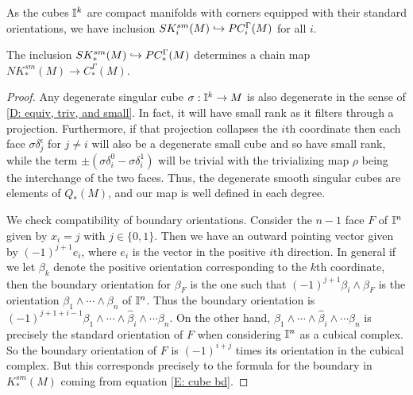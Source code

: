 As the cubes $\mathbb{I}^k$ are compact manifolds with corners equipped with their standard orientations,
 we have inclusion $SK^{sm}_i(M)\hookrightarrow PC_i^\Gamma(M)$ for all $i$.


\begin{lemma}
The inclusion $SK^{sm}_*(M)\hookrightarrow PC_*^\Gamma(M)$ determines a chain map $NK^{sm}_*(M) \to C_*^\Gamma(M)$.
\end{lemma}
\begin{proof}
Any degenerate singular cube $\sigma:\mathbb{I}^k \to M$ is also degenerate in the sense of \cref{D: equiv, triv, and small}. In fact, it will have small rank as it filters through a projection. Furthermore, if that projection collapses the $i$th coordinate then each face $\sigma \delta_j^\epsilon$ for $j\neq i$ will also be a degenerate small cube and so have small rank, while the term $\pm (\sigma \delta_i^0-\sigma \delta_i^1)$ will be trivial with the trivializing map $\rho$ being the interchange of the two faces. Thus, the degenerate smooth singular cubes are elements of $Q_*(M)$, and our map is well defined in each degree.

We check compatibility of boundary orientations. Consider the $n-1$ face $F$ of $\mathbb{I}^n$ given by $x_i = j$ with $j\in\{0,1\}$. Then we have an outward pointing vector given by $(-1)^{j+1}e_i$, where $e_i$ is the vector in the positive $i$th direction. In general if we let $\beta_k$ denote the positive orientation corresponding to the $k$th coordinate, then the boundary orientation for $\beta_F$ is the one such that
$(-1)^{j+1}\beta_i\wedge\beta_F$ is the orientation $\beta_1 \wedge\cdots\wedge \beta_n$ of $\mathbb{I}^n$. Thus the boundary orientation is $(-1)^{j+1+i-1}\beta_1 \wedge \cdots \wedge \hat{\beta}_i \wedge \cdots\beta_n$. On the other hand, $\beta_1 \wedge \cdots \wedge \hat{\beta}_i \wedge \cdots\beta_n$ is precisely the standard orientation of $F$ when considering $\mathbb{I}^n$ as a cubical complex. So the boundary orientation of $F$ is $(-1)^{i+j}$ times its orientation in the cubical complex. But this corresponds precisely to the formula for the boundary in $K^{sm}_*(M)$ coming from equation \eqref{E: cube bd}.
\end{proof}

